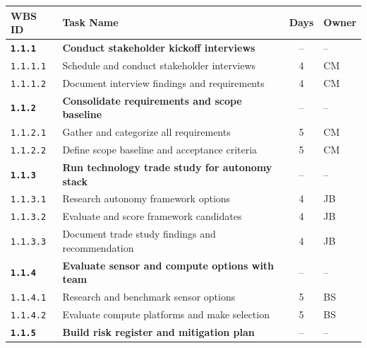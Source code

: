 \newpage
\begin{table}[H]
\centering
\small
\begin{tabular} {
  | l | p{6.5cm} | c | l |
}
\hline
\rowcolor { researchblue !40 }
\textbf{WBS ID} & \textbf{Task Name} & \textbf{Days} & \textbf { Owner }
\\
\hline
\rowcolor { researchblue !35 }
\texttt{\textbf{1.1.1}} & \textbf{Conduct stakeholder kickoff interviews} &
    --&-- \\
\hline
\rowcolor {
  white
}
\texttt{1.1.1.1} & \quad Schedule and conduct stakeholder interviews & 4 & CM \\
\hline
\rowcolor {
  researchblue !15
}
\texttt{1.1.1.2} & \quad Document interview findings and requirements & 4 & CM \\
\hline
\rowcolor {
  researchblue !35
}
\texttt{\textbf{1.1.2}} & \textbf{Consolidate requirements and scope baseline} &
    --&-- \\
\hline
\rowcolor {
  white
}
\texttt{1.1.2.1} & \quad Gather and categorize all requirements & 5 & CM \\
\hline
\rowcolor {
  researchblue !15
}
\texttt{1.1.2.2} & \quad Define scope baseline and acceptance criteria & 5 & CM \\
\hline
\rowcolor {
  researchblue !35
}
\texttt{\textbf{1.1.3}} & \textbf {Run technology trade study for autonomy stack
}
&--&-- \\
\hline
\rowcolor { white }
\texttt{1.1.3.1} & \quad Research autonomy framework options & 4 & JB \\
\hline
\rowcolor {
  researchblue !15
}
\texttt{1.1.3.2} & \quad Evaluate and score framework candidates & 4 & JB \\
\hline
\rowcolor {
  white
}
\texttt{1.1.3.3} & \quad Document trade study findings and recommendation & 4 &
    JB \\
\hline
\rowcolor {
  researchblue !35
}
\texttt{\textbf{1.1.4}} & \textbf{Evaluate sensor and
                                  compute options with team} &
    --&-- \\
\hline
\rowcolor {
  researchblue !15
}
\texttt{1.1.4.1} & \quad Research and benchmark sensor options & 5 & BS \\
\hline
\rowcolor {
  white
}
\texttt{1.1.4.2} & \quad Evaluate compute platforms and make selection & 5 & BS \\
\hline
\rowcolor {
  researchblue !35
}
\texttt{\textbf{1.1.5}} & \textbf{Build risk register and mitigation plan} &
    --&-- \\

\end{tabular}
\end{table}
